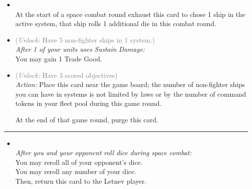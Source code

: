 \begin{multicols}{2}
\begin{itemize}
\item {}\\
At the start of a space combat round exhaust this card to chose 1 ship in the active system, that ship rolls 1 additional die in this combat round.
\item {} \textcolor{gray}{(\emph{Unlock:} Have 5 non-fighter ships in 1 system.)}\\
\emph{After 1 of your units uses \emph{Sustain Damage}:}
\\
You may gain 1 Trade Good. 
\item {} \textcolor{gray}{(\emph{Unlock:} Have 3 scored objectives)}\\
\emph{Action:} Place this card near the game board; the number of non-fighter ships you can have in systems is not limited by laws or by the number of command tokens in your fleet pool during this game round.

At the end of that game round, purge this card. 
\end{itemize}

\vspace{-10pt}\rule{\hsize}{0.4pt}\vspace{5pt}


\begin{itemize}
\item {}\\
\emph{After you and your opponent roll dice during space combat:}\\
You may reroll all of your opponent's dice.\\
You may reroll any number of your dice.\\
Then, return this card to the Letnev player.
\end{itemize}

\end{multicols}



